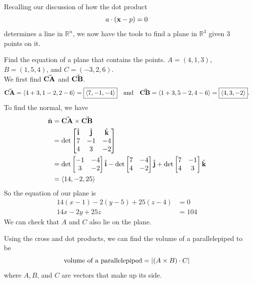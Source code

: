 Recalling our discussion of how the dot product 
\[ a \cdot \left( \vb{x} - p \right)=0 \]
determines a line in \( \mathbb{R}^{n} \), we now have the tools to find a plane in \( \mathbb{R}^{3} \) given \( 3 \) points on it. 
\begin{example}
    Find the equation of a plane that contains the points. \( A = \left( 4,1,3 \right) \), \( B = (1,5,4) \), and \( C = (-3,2,6) \). \\ 
    We first find \( \va{CA} \) and \( \va{CB} \). 
    \[ \va{CA} = \left< 4 +3, 1-2, 2-6  \right> = \boxed{\left< 7, -1, -4  \right>} \quad \text{and} \quad \va{CB} = \left< 1+3, 5-2 ,4-6 \right> = \boxed{\left< 4,3,-2 \right>} .\]
    To find the normal, we have \
    \begin{align*}
        \hat{\vb{n}} &= \va{CA} \times \va{CB} \\
        &= \mathrm{det} \begin{bmatrix}
            \hat{\vb{i}} & \hat{\vb{j}}& \hat{\vb{k}}\\
            7 & -1 & -4\\
            4 & 3 & -2\\
        \end{bmatrix}\\
        &= \mathrm{det} \begin{bmatrix}
            -1 & -4\\
            3 & -2\\
        \end{bmatrix} \hat{\vb{i}} - \mathrm{det} \begin{bmatrix}
            7 & -4\\
            4 & -2 \\
        \end{bmatrix}\hat{\vb{j}} + \mathrm{det}\begin{bmatrix}
            7 & -1\\
            4 & 3\\
        \end{bmatrix} \hat{\vb{k}} \\
        &= \left< 14, -2, 25 \right>
    \end{align*}
    So the equation of our plane is 
    \begin{align*}
        14(x-1) - 2 \left( y-5 \right) + 25(z-4) &=0 \\
        14x -2y + 25z &= 104
    \end{align*}
    We can check that \( A \) and \( C \) also lie on the plane.
\end{example}

Using the cross and dot products, we can find the volume of a parallelepiped to be 
\[ \text{volume of a parallelepiped} = \abs{ \left( A \times B  \right) \cdot C} \]
where \( A, B \), and \( C \) are vectors that make up its side. 
